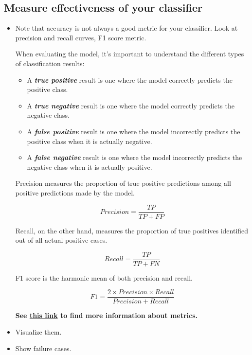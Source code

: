 \documentclass[
]{article}
\providecommand{\tightlist}{%
  \setlength{\itemsep}{0pt}\setlength{\parskip}{0pt}}
\begin{document}
\subsection{Measure effectiveness of your
classifier}\label{measure-effectiveness-of-your-classifier}

\begin{itemize}
\item
  Note that accuracy is not always a good metric for your classifier.
  Look at precision and recall curves, F1 score metric.

  When evaluating the model, it's important to understand the different
  types of classification results:

  \begin{itemize}
  \tightlist
  \item
    A \textbf{\emph{true positive}} result is one where the model
    correctly predicts the positive class.
  \item
    A \textbf{\emph{true negative}} result is one where the model
    correctly predicts the negative class.
  \item
    A \textbf{\emph{false positive}} result is one where the model
    incorrectly predicts the positive class when it is actually
    negative.
  \item
    A \textbf{\emph{false negative}} result is one where the model
    incorrectly predicts the negative class when it is actually
    positive.
  \end{itemize}

  Precision measures the proportion of true positive predictions among
  all positive predictions made by the model.

  \[
  Precision = \frac{TP}{TP+FP}
  \]

  Recall, on the other hand, measures the proportion of true positives
  identified out of all actual positive cases.

  \[
  Recall = \frac{TP}{TP+FN}
  \]

  F1 score is the harmonic mean of both precision and recall.

  \[
  F1 = \frac{2\times Precision \times Recall}{Precision + Recall}
  \]

  \textbf{See
  \href{https://cohere.com/blog/classification-eval-metrics}{this link}
  to find more information about metrics.}
\item
  Visualize them.
\item
  Show failure cases.
\end{itemize}
\end{document}
